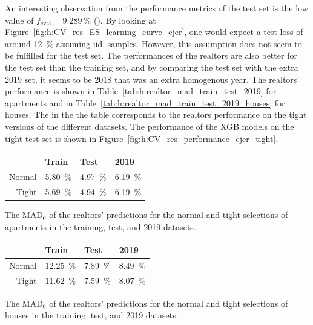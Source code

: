 An interesting observation from the performance metrics of the test set is the low value of $f_\mathrm{eval}=\SI{9.289}{\percent}$ (). By looking at Figure~\ref{fig:h:CV_res_ES_learning_curve_ejer}, one would expect a test loss of around \SI{12}{\percent} assuming iid. samples. However, this assumption does not seem to be fulfilled for the test set. The performances of the realtors are also better for the test set than the training set, and by comparing the test set with the extra \num{2019} set, it seems to be \num{2018} that was an extra homogenous year. The realtors' performance is shown in Table~\ref{tab:h:realtor_mad_train_test_2019} for apartments and in Table~\ref{tab:h:realtor_mad_train_test_2019_houses} for houses. The  in the the table corresponds to the realtors performance on the tight versions of the different datasets. The performance of the XGB models on the tight test set is shown in Figure~\ref{fig:h:CV_res_performance_ejer_tight}. 
\begin{margintable}[-0.5cm]
  \centerfloat
  \begin{tabular}{@{}rlll@{}}
          & Train               & Test                & \num{2019}          \\ \midrule
  Normal  & \SI{5.80}{\percent} & \SI{4.97}{\percent} & \SI{6.19}{\percent} \\
  Tight   & \SI{5.69}{\percent} & \SI{4.94}{\percent} & \SI{6.19}{\percent} 
  \end{tabular}
  \vspace{2mm}
  \caption[Realtors' MAD for apartments]{The $\mathrm{MAD}_0$ of the realtors' predictions for the normal and tight selections of apartments in the training, test, and \num{2019} datasets.}
  \label{tab:h:realtor_mad_train_test_2019}
\end{margintable}
\begin{margintable}[0.1cm]
  \centerfloat
  \begin{tabular}{@{}rlll@{}}
          & Train               & Test                & \num{2019}          \\ \midrule
  Normal  & \SI{12.25}{\percent} & \SI{7.89}{\percent} & \SI{8.49}{\percent} \\
  Tight   & \SI{11.62}{\percent} & \SI{7.59}{\percent} & \SI{8.07}{\percent} 
  \end{tabular}
  \vspace{2mm}
  \caption[Realtors' MAD for houses]{The $\mathrm{MAD}_0$ of the realtors' predictions for the normal and tight selections of houses in the training, test, and \num{2019} datasets.}
  \label{tab:h:realtor_mad_train_test_2019_houses}
\end{margintable}

